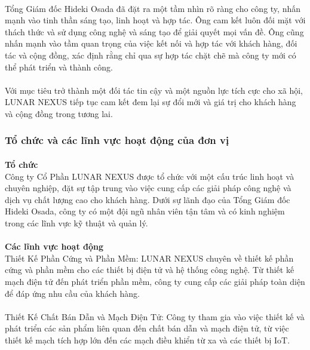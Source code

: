\begin{flushleft}
		\paragraph{}
		Tổng Giám đốc Hideki Osada đã đặt ra một tầm nhìn rõ ràng cho công ty, nhấn mạnh vào tinh thần sáng tạo, linh hoạt và hợp tác. Ông cam kết luôn đối mặt với thách thức và sử dụng công nghệ và sáng tạo để giải quyết mọi vấn đề. Ông cũng nhấn mạnh vào tầm quan trọng của việc kết nối và hợp tác với khách hàng, đối tác và cộng đồng, xác định rằng chỉ qua sự hợp tác chặt chẽ mà công ty mới có thể phát triển và thành công.
		\paragraph{}
		Với mục tiêu trở thành một đối tác tin cậy và một nguồn lực tích cực cho xã hội, LUNAR NEXUS tiếp tục cam kết đem lại sự đổi mới và giá trị cho khách hàng và cộng đồng trong tương lai.
		\subsubsection{Tổ chức và các lĩnh vực hoạt động của đơn vị}
		\paragraph{}
		\textbf{Tổ chức}\\
		Công ty Cổ Phần LUNAR NEXUS được tổ chức với một cấu trúc linh hoạt và chuyên nghiệp, đặt sự tập trung vào việc cung cấp các giải pháp công nghệ và dịch vụ chất lượng cao cho khách hàng. Dưới sự lãnh đạo của Tổng Giám đốc Hideki Osada, công ty có một đội ngũ nhân viên tận tâm và có kinh nghiệm trong các lĩnh vực kỹ thuật và quản lý. \\
		\paragraph{}
		\textbf{Các lĩnh vực hoạt động}\\
		Thiết Kế Phần Cứng và Phần Mềm: LUNAR NEXUS chuyên về thiết kế phần cứng và phần mềm cho các thiết bị điện tử và hệ thống công nghệ. Từ thiết kế mạch điện tử đến phát triển phần mềm, công ty cung cấp các giải pháp toàn diện để đáp ứng nhu cầu của khách hàng.\\
		\paragraph{}
		Thiết Kế Chất Bán Dẫn và Mạch Điện Tử: Công ty tham gia vào việc thiết kế và phát triển các sản phẩm liên quan đến chất bán dẫn và mạch điện tử, từ việc thiết kế mạch tích hợp lớn đến các mạch điều khiển từ xa và các thiết bị IoT.\\

\end{flushleft}
